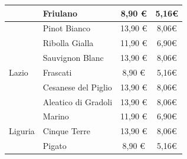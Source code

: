 \documentclass[12pt, a4paper]{article}
\begin{document}
\begin{longtable}{@{}|l|l|c|c|}
& Friulano                                                                  & 8,90 €                                                          & 5,16€                                                                                 \\ \hline
& Pinot Bianco                                                              & 13,90 €                                                         & 8,06€                                                                                 \\ \hline
& Ribolla Gialla                                                            & 11,90 €                                                         & 6,90€                                                                                 \\ \hline
& Sauvignon Blanc                                                           & 13,90 €                                                         & 8,06€                                                                                 \\ \hline
Lazio                & Frascati                                                                  & 8,90 €                                                          & 5,16€                                                                                 \\ \hline
& Cesanese del Piglio                                                       & 13,90 €                                                         & 8,06€                                                                                 \\ \hline
& Aleatico di Gradoli                                                       & 13,90 €                                                         & 8,06€                                                                                 \\ \hline
& Marino                                                                    & 11,90 €                                                         & 6,90€                                                                                 \\ \hline
Liguria              & Cinque Terre                                                              & 13,90 €                                                         & 8,06€                                                                                 \\ \hline
& Pigato                                                                    & 8,90 €                                                          & 5,16€                                                                                 \\ \hline

\end{longtable}
\end{document}
